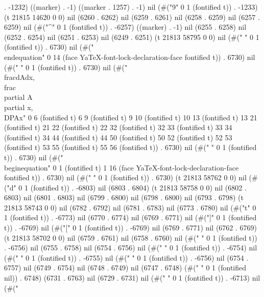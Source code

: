. -1232) ((marker) . -1) ((marker . 1257) . -1) nil (#("9" 0 1 (fontified t)) . -1233) (t 21815 14620 0 0) nil (6260 . 6262) nil (6259 . 6261) nil (6258 . 6259) nil (6257 . 6259) nil (#("^" 0 1 (fontified t)) . -6257) ((marker) . -1) nil (6255 . 6258) nil (6252 . 6254) nil (6251 . 6253) nil (6249 . 6251) (t 21813 58795 0 0) nil (#("
" 0 1 (fontified t)) . 6730) nil (#("\\end{equation}" 0 14 (face YaTeX-font-lock-declaration-face fontified t)) . 6730) nil (#("
" 0 1 (fontified t)) . 6730) nil (#(" \\frac{dA}{dx}, \\frac{\\partial A}{\\partial x}, \\DP{A}{x}" 0 6 (fontified t) 6 9 (fontified t) 9 10 (fontified t) 10 13 (fontified t) 13 21 (fontified t) 21 22 (fontified t) 22 32 (fontified t) 32 33 (fontified t) 33 34 (fontified t) 34 44 (fontified t) 44 50 (fontified t) 50 52 (fontified t) 52 53 (fontified t) 53 55 (fontified t) 55 56 (fontified t)) . 6730) nil (#("
" 0 1 (fontified t)) . 6730) nil (#("\\begin{equation}" 0 1 (fontified t) 1 16 (face YaTeX-font-lock-declaration-face fontified t)) . 6730) nil (#("
" 0 1 (fontified t)) . 6730) (t 21813 58762 0 0) nil (#("d" 0 1 (fontified t)) . -6803) nil (6803 . 6804) (t 21813 58758 0 0) nil (6802 . 6803) nil (6801 . 6803) nil (6799 . 6800) nil (6798 . 6800) nil (6793 . 6798) (t 21813 58743 0 0) nil (6782 . 6792) nil (6781 . 6783) nil (6773 . 6780) nil (#("t" 0 1 (fontified t)) . -6773) nil (6770 . 6774) nil (6769 . 6771) nil (#("]" 0 1 (fontified t)) . -6769) nil (#("[" 0 1 (fontified t)) . -6769) nil (6769 . 6771) nil (6762 . 6769) (t 21813 58702 0 0) nil (6759 . 6761) nil (6758 . 6760) nil (#(" " 0 1 (fontified t)) . -6756) nil (6755 . 6758) nil (6754 . 6756) nil (#("
" 0 1 (fontified t)) . -6754) nil (#(" " 0 1 (fontified t)) . -6755) nil (#(" " 0 1 (fontified t)) . -6756) nil (6754 . 6757) nil (6749 . 6754) nil (6748 . 6749) nil (6747 . 6748) (#(" " 0 1 (fontified nil)) . 6748) (6731 . 6763) nil (6729 . 6731) nil (#("
" 0 1 (fontified t)) . -6713) nil (#("
